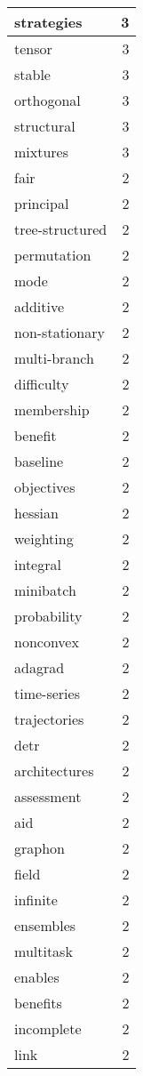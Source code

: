 \begin{table}[h]
\begin{tabular}{|l|r|}
\hline
strategies & 3 \\
\hline
tensor & 3 \\
\hline
stable & 3 \\
\hline
orthogonal & 3 \\
\hline
structural & 3 \\
\hline
mixtures & 3 \\
\hline
fair & 2 \\
\hline
principal & 2 \\
\hline
tree-structured & 2 \\
\hline
permutation & 2 \\
\hline
mode & 2 \\
\hline
additive & 2 \\
\hline
non-stationary & 2 \\
\hline
multi-branch & 2 \\
\hline
difficulty & 2 \\
\hline
membership & 2 \\
\hline
benefit & 2 \\
\hline
baseline & 2 \\
\hline
objectives & 2 \\
\hline
hessian & 2 \\
\hline
weighting & 2 \\
\hline
integral & 2 \\
\hline
minibatch & 2 \\
\hline
probability & 2 \\
\hline
nonconvex & 2 \\
\hline
adagrad & 2 \\
\hline
time-series & 2 \\
\hline
trajectories & 2 \\
\hline
detr & 2 \\
\hline
architectures & 2 \\
\hline
assessment & 2 \\
\hline
aid & 2 \\
\hline
graphon & 2 \\
\hline
field & 2 \\
\hline
infinite & 2 \\
\hline
ensembles & 2 \\
\hline
multitask & 2 \\
\hline
enables & 2 \\
\hline
benefits & 2 \\
\hline
incomplete & 2 \\
\hline
link & 2 \\

\end{tabular}
\end{table}
